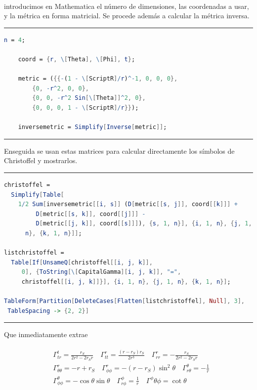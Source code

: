 \documentclass[%
 reprint,
 amsmath,amssymb,
 aps,
floatfix,
]{revtex4-1}
\begin{document}
introducimos en Mathematica\textsuperscript{\textregistered} el número de dimensiones, las coordenadas a usar, y la métrica en forma matricial. Se procede además a calcular la métrica inversa.

\onecolumngrid
\vspace{12pt}
\hrule
\begin{lstlisting}[language=Mathematica]
    n = 4;

    coord = {r, \[Theta], \[Phi], t};
    
    metric = ({{-(1 - \[ScriptR]/r)^-1, 0, 0, 0},
        {0, -r^2, 0, 0},
        {0, 0, -r^2 Sin[\[Theta]]^2, 0},
        {0, 0, 0, 1 - \[ScriptR]/r}});
    
    inversemetric = Simplify[Inverse[metric]];
\end{lstlisting}
\hrule
\vspace{12pt}
\twocolumngrid

Enseguida se usan estas matrices para calcular directamente los símbolos de Christoffel y mostrarlos.

\onecolumngrid
\vspace{32pt}
\hrule
\begin{lstlisting}[language=Mathematica]
christoffel = 
  Simplify[Table[
    1/2 Sum[inversemetric[[i, s]] (D[metric[[s, j]], coord[[k]]] + 
         D[metric[[s, k]], coord[[j]]] - 
         D[metric[[j, k]], coord[[s]]]), {s, 1, n}], {i, 1, n}, {j, 1,
      n}, {k, 1, n}]];

listchristoffel = 
  Table[If[UnsameQ[christoffel[[i, j, k]], 
     0], {ToString[\[CapitalGamma][i, j, k]], "=", 
     christoffel[[i, j, k]]}], {i, 1, n}, {j, 1, n}, {k, 1, n}];
     
TableForm[Partition[DeleteCases[Flatten[listchristoffel], Null], 3], 
 TableSpacing -> {2, 2}]
\end{lstlisting}
\hrule
\vspace{12pt}
\twocolumngrid

Que inmediatamente extrae

\begin{align}
    \begin{split}
    & \Gamma^t_{tr} = \tfrac{r_S}{2r^2 - 2r_Sr} \quad \Gamma^r_{tt} = \tfrac{(r-r_S)r_S}{2r^3} \quad \Gamma^r_{rr} = -\tfrac{r_S}{2r^2 - 2r_Sr}\\
    & \Gamma^r_{\theta\theta} = -r+r_S \quad \Gamma^r_{\phi\phi} = -(r-r_S)\sin^2{\theta} \quad \Gamma^\theta_{r\theta} = -\tfrac{1}{r}\\
    & \Gamma^\theta_{\phi\phi} = -\cos{\theta}\sin{\theta} \quad \Gamma^\phi_{r\phi} = \tfrac{1}{r} \quad \Gamma^\phi{\theta\phi} = \cot{\theta}
    \end{split}
\end{align}
\end{document}
